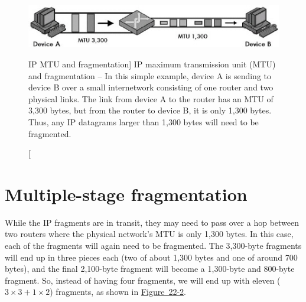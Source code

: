 \begin{figure}
   \centering
   \includegraphics[width=.9\textwidth]{images/mtu-fragmentation.jpg}
   \caption
      [IP MTU and fragmentation]
      {IP maximum transmission unit (MTU) and fragmentation --
      In this simple example, device A is sending to device B over a small internetwork consisting of one router and two physical links.
      The link from device A to the router has an MTU of 3,300 bytes, but from the router to device B, it is only 1,300 bytes.
      Thus, any IP datagrams larger than 1,300 bytes will need to be fragmented.}
   \label{fig:mtu-fragmentation}
\end{figure}



\section{Multiple-stage fragmentation}

While the IP fragments are in transit, they may need to pass over a hop between two routers where the physical network's MTU is only 1,300 bytes.
In this case, each of the fragments will again need to be fragmented.
The 3,300-byte fragments will end up in three pieces each (two of about 1,300 bytes and one of around 700 bytes), and the final 2,100-byte
fragment will become a 1,300-byte and 800-byte fragment.
So, instead of having four fragments, we will end up with eleven ($3\times 3+1\times 2$) fragments,
as shown in \protect\hyperlink{ch22.htmlux5cux23ipv4_datagram_fragmentation_this_example}{Figure~22-2}.

